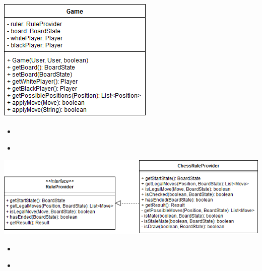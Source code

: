 \documentclass[parskip=full]{scrartcl}
\begin{document}
		\begin{minipage}{\linewidth}
			\centering
			\includegraphics[width=1\linewidth]{Diagramme/Game}
			\label{fig:game}
		\end{minipage}
		\begin{itemize}
			\item
				\begin{description}
				
				\end{description}
			\item
				\begin{description}
				
				\end{description}
		\end{itemize}		
		\newpage
		
		\begin{minipage}{\linewidth}
			\centering
			\includegraphics[width=1\linewidth]{Diagramme/RuleProvider}
			\label{fig:ruleProvider}
		\end{minipage}
		\begin{itemize}
			\item
				\begin{description}
				
				\end{description}
			\item
				\begin{description}
				
				\end{description}
		\end{itemize}
		\newpage
\end{document}
